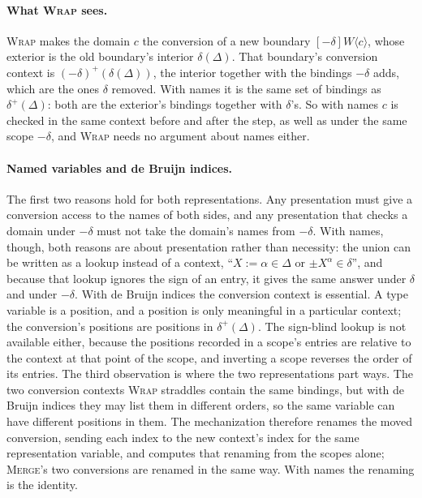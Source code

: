 \documentclass[acmsmall,screen,review,anonymous,nonacm]{acmart}
\newcommand{\dual}[1]{-#1}
\newcommand{\by}{{:=}}
\newcommand{\boundry}[3]{\left[#2\right] #1 \langle #3 \rangle}
\begin{document}
\paragraph{What \textsc{Wrap} sees.}
\textsc{Wrap} makes the domain $c$ the conversion of a new boundary
$\boundry{W}{\dual{\delta}}{c}$, whose exterior is the old boundary's
interior $\delta(\Delta)$.  That boundary's conversion context is
$(\dual{\delta})^{+}(\delta(\Delta))$, the interior together with the
bindings $\dual{\delta}$ adds, which are the ones $\delta$ removed.
With names it is the same set of bindings as $\delta^{+}(\Delta)$:
both are the exterior's bindings together with $\delta$'s.  So with
names $c$ is checked in the same context before and after the step, as
well as under the same scope $\dual{\delta}$, and \textsc{Wrap} needs no
argument about names either.

\paragraph{Named variables and de Bruijn indices.}
The first two reasons hold for both representations.  Any presentation
must give a conversion access to the names of both sides, and any
presentation that checks a domain under $\dual{\delta}$ must not take
the domain's names from $\dual{\delta}$.  With names, though, both
reasons are about presentation rather than necessity: the union can be
written as a lookup instead of a context, ``$X \by \alpha \in \Delta$ or
${\pm X}^\alpha \in \delta$'', and because that lookup ignores the sign
of an entry, it gives the same answer under $\delta$ and under
$\dual{\delta}$.  With de Bruijn indices the conversion context is
essential.  A type variable is a position, and a position is only
meaningful in a particular context; the conversion's positions are
positions in $\delta^{+}(\Delta)$.  The sign-blind lookup is not
available either, because the positions recorded in a scope's entries
are relative to the context at that point of the scope, and inverting a
scope reverses the order of its entries.  The third observation is where
the two representations part ways.  The two conversion contexts
\textsc{Wrap} straddles contain the same bindings, but with de Bruijn
indices they may list them in different orders, so the same variable can
have different positions in them.  The mechanization therefore renames
the moved conversion, sending each index to the new context's index for
the same representation variable, and computes that renaming from the
scopes alone; \textsc{Merge}'s two conversions are renamed in the same
way.  With names the renaming is the identity.



\end{document}
